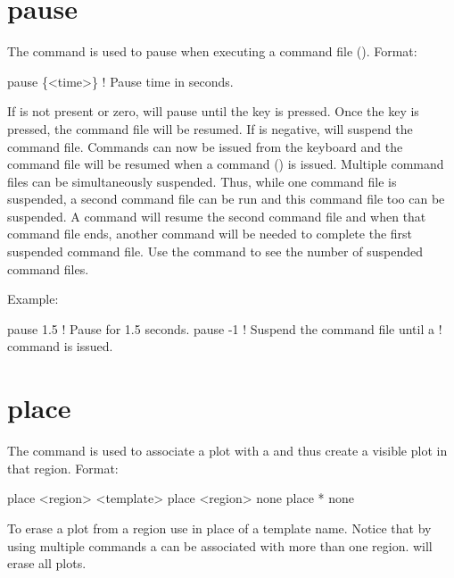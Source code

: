 \section{pause}
\label{s:pause}

The  command is used to pause \tao when executing a command
file (). Format:
\begin{example}
  pause \{<time>\} ! Pause time in seconds.
\end{example}
\vskip 0.2in

If  is not present or zero, \tao will pause until the
 key is pressed. Once the  key is pressed, the command
file will be resumed. If  is negative, \tao will suspend
the command file. Commands can now be issued from the keyboard and the
command file will be resumed when a  command
() is issued. Multiple command files can be
simultaneously suspended.  Thus, while one command file is suspended, a
second command file can be run and this command file too can be
suspended. A  command will resume the second command file
and when that command file ends, another  command will be
needed to complete the first suspended command file. Use the  command to see the number of suspended command files.

Example:
\begin{example}
  pause 1.5    ! Pause for 1.5 seconds.
  pause -1     ! Suspend the command file until a  
               !   command is issued.
\end{example}

\section{place}
\label{s:place}

The  command is used to associate a  plot
with a  and thus create a visible plot in that region. Format:
\begin{example}
  place <region> <template>
  place <region> none
  place * none
\end{example}

\vskip 0.2in 

To erase a plot from a region use  in place of a template
name. Notice that by using multiple  commands a
 can be associated with more than one region.
 will erase all plots.

